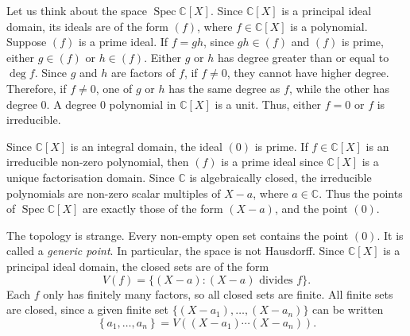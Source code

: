 \documentclass[a4paper,11pt]{article}
\begin{document}
    \begin{example}
      Let us think about the space \(\operatorname{Spec}\mathbb{C}[X]\). Since \(\mathbb{C}[X]\) is a principal ideal domain, its ideals are of the form \((f)\), where \(f \in \mathbb{C}[X]\) is a polynomial. Suppose \((f)\) is a prime ideal. If \(f = gh\), since \(gh \in (f)\) and \((f)\) is prime, either \(g \in (f)\) or \(h \in (f)\). Either \(g\) or \(h\) has degree greater than or equal to \(\operatorname{deg}f\). Since \(g\) and \(h\) are factors of \(f\), if \(f \ne 0\), they cannot have higher degree. Therefore, if \(f \ne 0\), one of \(g\) or \(h\) has the same degree as \(f\), while the other has degree \(0\). A degree \(0\) polynomial in \(\mathbb{C}[X]\) is a unit. Thus, either \(f = 0\) or \(f\) is irreducible.

      Since \(\mathbb{C}[X]\) is an integral domain, the ideal \((0)\) is prime. If \(f \in \mathbb{C}[X]\) is an irreducible non-zero polynomial, then \((f)\) is a prime ideal since \(\mathbb{C}[X]\) is a unique factorisation domain. Since \(\mathbb{C}\) is algebraically closed, the irreducible polynomials are non-zero scalar multiples of \(X - a\), where \(a \in \mathbb{C}\). Thus the points of \(\operatorname{Spec}\mathbb{C}[X]\) are exactly those of the form \((X - a)\), and the point \((0)\).

      The topology is strange. Every non-empty open set contains the point \((0)\). It is called a \textit{generic point}. In particular, the space is not Hausdorff. Since \(\mathbb{C}[X]\) is a principal ideal domain, the closed sets are of the form \[V(f) = \{(X - a) : (X - a)\text{ divides }f\}.\] Each \(f\) only has finitely many factors, so all closed sets are finite. All finite sets are closed, since a given finite set \(\{(X - a_1), \dots, (X - a_n)\}\) can be written
      \[
        \left\{a_1, \dots, a_n\right\} = V((X - a_1) \cdots (X - a_n)).
      \]
    \end{example}
    \nocite{*}
    \printbibliography
\end{document}
